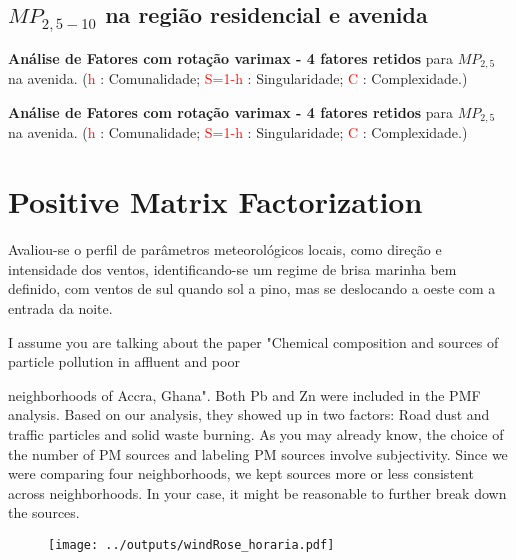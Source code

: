 \subsection{$MP_{2,5-10}$ na região residencial e avenida}

\begin{table}[H]
  \caption{\textbf{Análise de Fatores com rotação varimax - 4 fatores retidos} 
             para $MP_{2,5}$ na avenida.
           (\textcolor{red}{h} : Comunalidade; 
           \textcolor{red}{S=1-h} : Singularidade; 
           \textcolor{red}{C} : Complexidade.)}
  
\end{table}

\begin{table}[H]
  \caption{\textbf{Análise de Fatores com rotação varimax - 4 fatores retidos} 
             para $MP_{2,5}$ na avenida.
           (\textcolor{red}{h} : Comunalidade; 
           \textcolor{red}{S=1-h} : Singularidade; 
           \textcolor{red}{C} : Complexidade.)}
  
\end{table}

\section{Positive Matrix Factorization}
Avaliou-se o perfil de parâmetros meteorológicos locais, como direção e intensidade dos ventos, 
identificando-se um regime de brisa marinha bem definido, com ventos de sul quando sol a pino, mas se deslocando a oeste com a entrada da noite. 

I assume you are talking about the paper "Chemical composition and sources of particle pollution in affluent and poor

neighborhoods of Accra, Ghana". Both Pb and Zn were included in the PMF analysis. Based on our analysis, they showed up in two factors: Road dust and traffic particles and solid waste burning. As you may already know, the choice of the number of PM sources and labeling PM sources involve subjectivity. Since we were comparing four neighborhoods, we kept sources more or less consistent across neighborhoods. In your case, it might be reasonable to further break down the sources.

\begin{figure}[H]
  \centering
  \texttt{[image: ../outputs/windRose\_horaria.pdf]}
  \caption{ \citep{carslaw2012} \label{fig:windRose_horaria}}
\end{figure}

